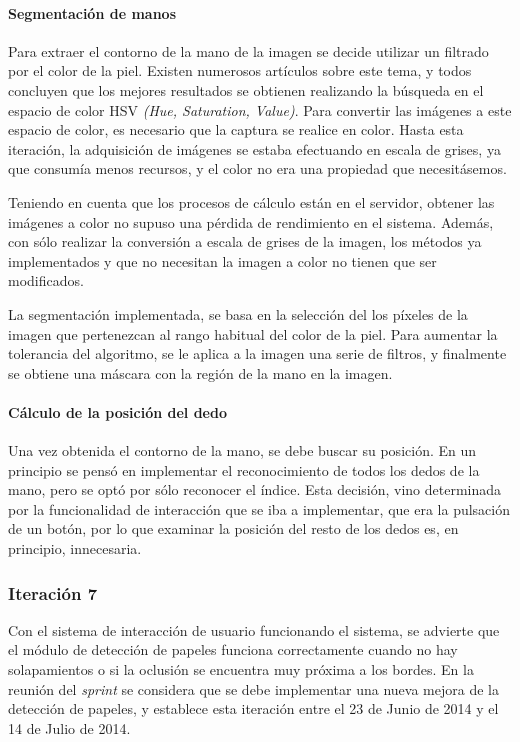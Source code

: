 \paragraph{Segmentación de manos}
Para extraer el contorno de la mano de la imagen se decide utilizar un filtrado por el color de la piel. Existen numerosos artículos sobre este tema, y todos concluyen que los mejores resultados se obtienen realizando la búsqueda en el espacio de color HSV \textit{(Hue, Saturation, Value)}. Para convertir las imágenes a este espacio de color, es necesario que la captura se realice en color. Hasta esta iteración, la adquisición de imágenes se estaba efectuando en escala de grises, ya que consumía menos recursos, y el color no era una propiedad que necesitásemos.

Teniendo en cuenta que los procesos de cálculo están en el servidor, obtener las imágenes a color no supuso una pérdida de rendimiento en el sistema. Además, con sólo realizar la conversión a escala de grises de la imagen, los métodos
ya implementados y que no necesitan la imagen a color no tienen que ser modificados.

La segmentación implementada, se basa en la selección del los píxeles de la imagen que pertenezcan al rango habitual del color de la piel. Para aumentar la tolerancia del algoritmo, se le aplica a la imagen una serie de filtros, y finalmente se obtiene una máscara con la región de la mano en la imagen.

\paragraph{Cálculo de la posición del dedo}
Una vez obtenida el contorno de la mano, se debe buscar su posición. En un principio se pensó en implementar el reconocimiento de todos los dedos de la mano, pero se optó por sólo reconocer el índice. Esta decisión, vino determinada por la funcionalidad de interacción que se iba a implementar, que era la pulsación de un botón, por lo que examinar la posición del resto de los dedos es, en principio, innecesaria. 

\subsubsection{Iteración 7}
Con el sistema de interacción de usuario funcionando el sistema, se advierte que el módulo de detección de papeles funciona correctamente cuando no hay solapamientos o si la oclusión se encuentra muy próxima a los bordes. En la reunión del \textit{sprint} se considera que se debe implementar una nueva mejora de la detección de papeles, y establece esta iteración entre el 23 de Junio de 2014 y el 14 de Julio de 2014.

